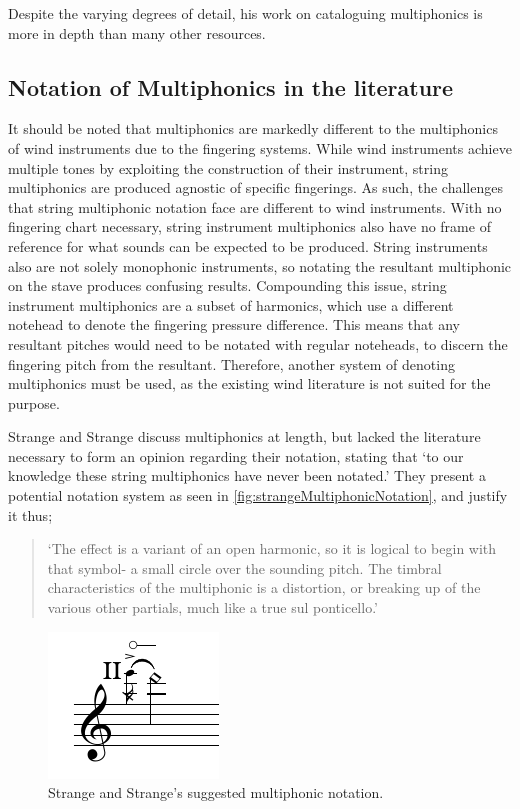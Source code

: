   Despite the varying degrees of detail, his work on cataloguing multiphonics is more in depth than many other resources.

 

\subsection{Notation of Multiphonics in the literature}

It should be noted that multiphonics are markedly different to the multiphonics of wind instruments due to the fingering systems.
While wind instruments achieve multiple tones by exploiting the construction of their instrument, string multiphonics are produced agnostic of specific fingerings.
As such, the challenges that string multiphonic notation face are different to wind instruments.
With no fingering chart necessary, string instrument multiphonics also have no frame of reference for what sounds can be expected to be produced.
String instruments also are not solely monophonic instruments, so notating the resultant multiphonic on the stave produces confusing results.
Compounding this issue, string instrument multiphonics are a subset of harmonics, which use a different notehead to denote the fingering pressure difference.
This means that any resultant pitches would need to be notated with regular noteheads, to discern the fingering pitch from the resultant.
Therefore, another system of denoting multiphonics must be used, as the existing wind literature is not suited for the purpose.

Strange and Strange discuss multiphonics at length, but lacked the literature necessary to form an opinion regarding their notation, stating that `to our knowledge these string multiphonics have never been notated.'\autocite[132--134]{strangeContemporaryViolinExtended2001}
They present a potential notation system as seen in \autoref{fig:strangeMultiphonicNotation}, and justify it thus;

\begin{quote}
  `The effect is a variant of an open harmonic, so it is logical to begin with that symbol- a small circle over the sounding pitch. 
  The timbral characteristics of the multiphonic is a distortion, or breaking up of the various other partials, much like a true sul ponticello.'
\end{quote}

  \begin{figure}
    \centering
    \includegraphics{./resources/strangeMultiphonicNotation.pdf}
    \caption{Strange and Strange's suggested multiphonic notation.}\label{fig:strangeMultiphonicNotation}\end{figure}

